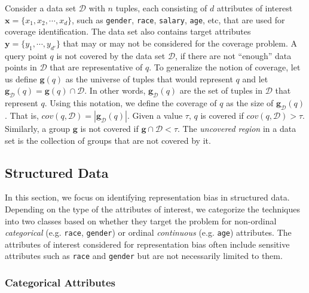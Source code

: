 \documentclass[11pt]{article}
\newcommand{\dee}{\mathcal{D}}
\newcommand{\gee}{\mathbf{g}}
\begin{document}
\begin{definition}\label{def:coverage}
Consider a data set $\dee$ with $n$ tuples, each consisting of $d$ attributes of interest $\mathbf{x}=\{x_1, x_2, \cdots,x_d\}$, such as {\tt gender}, {\tt race}, {\tt salary}, {\tt age}, etc, that are used for coverage identification.
The data set also contains target attributes $\mathbf{y} = \{ y_1,\cdots,y_{d'}\}$ that may or may not be considered for the coverage problem.
A query point $q$ is not covered by the data set $\dee$, if there are not ``enough'' data points in $\dee$ that are representative of $q$.
To generalize the notion of coverage, let us define $\gee(q)$ as the universe of tuples that would represent $q$ and let $\gee_\dee(q) = \gee(q)\cap \dee$. In other words, $\gee_\dee(q)$ are the set of tuples in $\dee$ that represent $q$.
Using this notation, we define the coverage of $q$ as the size of $\gee_\dee(q)$. That is,
$cov(q,\dee) = | \gee_\dee(q)|$.
Given a value $\tau$, $q$ is covered if $cov(q,\dee)>\tau$.
Similarly, a group $\gee$ is not covered if $\gee\cap \dee<\tau$.
The {\it uncovered region} in a data set is the collection of groups that are not covered by it.
\end{definition}

\subsection{Structured Data}
In this section, we focus on identifying representation bias in structured data.
Depending on the type of the attributes of interest, we categorize the techniques into two classes based on whether they target the problem for non-ordinal {\it categorical} (e.g. {\tt race}, {\tt gender}) or ordinal {\it continuous} (e.g. {\tt age}) attributes. The attributes of interest considered for representation bias often include sensitive attributes such as {\tt race} and {\tt gender} but are not necessarily limited to them.

\subsubsection{Categorical Attributes}
\end{document}
